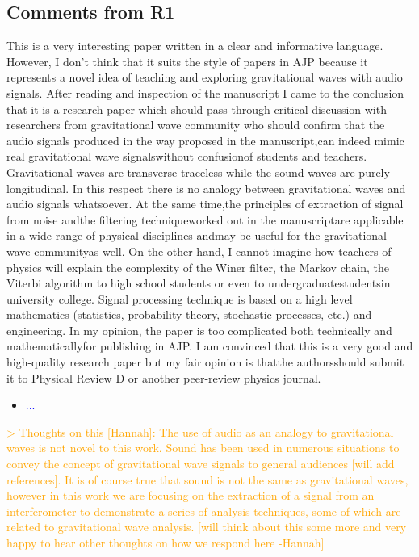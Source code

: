 \documentclass{article}
\newcommand{\todo}{\textcolor{blue}}
\newcommand{\han}{\textcolor{orange}}
\begin{document}
\subsection{Comments from R1}

This is a very interesting paper written in a clear and informative language. However, I don’t think that it suits the style of papers in AJP because it represents a novel idea of teaching and exploring gravitational waves with audio signals. After reading and inspection of the manuscript I came to the  conclusion  that it is a  research  paper  which should pass  through critical discussion  with researchers  from gravitational  wave  community who  should  confirm  that  the audio signals produced in the way proposed in the manuscript,can indeed mimic real gravitational wave signalswithout confusionof students and teachers. Gravitational waves are transverse-traceless while the sound waves are purely longitudinal. In this respect there is no analogy between gravitational waves and audio signals whatsoever. At the same time,the principles of extraction of signal from noise andthe filtering techniqueworked out in the manuscriptare applicable in a wide range of physical disciplines andmay be useful for the gravitational wave communityas well. On the other hand, I cannot imagine how teachers of physics will explain the complexity of the Winer filter, the Markov chain, the Viterbi algorithm to high school students or even to undergraduatestudentsin university college. Signal  processing technique is based  on a  high  level  mathematics (statistics, probability theory, stochastic processes, etc.) and engineering. In my opinion, the paper is too complicated both technically and mathematicallyfor publishing in AJP. I am convinced that this is a very good and high-quality research  paper but  my  fair  opinion  is  thatthe authorsshould submit  it  to  Physical Review D or another peer-review physics journal. 
\begin{itemize}
\item \todo{...}
\end{itemize}



\han{> Thoughts on this [Hannah]: The use of audio as an analogy to gravitational waves is not novel to this work. Sound has been used in numerous situations to convey the concept of gravitational wave signals to general audiences [will add references]. It is of course true that sound is not the same as gravitational waves, however in this work we are focusing on the extraction of a signal from an interferometer to demonstrate a series of analysis techniques, some of which are related to gravitational wave analysis. [will think about this some more and very happy to hear other thoughts on how we respond here -Hannah]}
\end{document}
